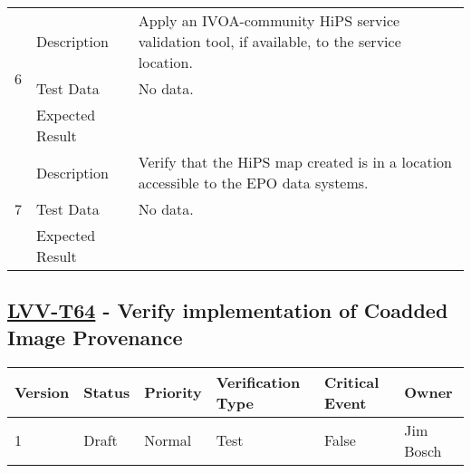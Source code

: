 \begin{longtable}[]{p{1.3cm}p{2cm}p{13cm}}
            \multirow{3}{*}{ 6 } & Description &
            \begin{minipage}[t]{13cm}{\footnotesize
            Apply an IVOA-community HiPS service validation tool, if available, to
the service location.

            \vspace{\dp0}
            } \end{minipage} \\ \cline{2-3}
            & Test Data &
            \begin{minipage}[t]{13cm}{\footnotesize
                No data.
                \vspace{\dp0}
            } \end{minipage} \\ \cline{2-3}
            & Expected Result &
        \\ \midrule

            \multirow{3}{*}{ 7 } & Description &
            \begin{minipage}[t]{13cm}{\footnotesize
            Verify that the HiPS map created is in a location accessible to the EPO
data systems.

            \vspace{\dp0}
            } \end{minipage} \\ \cline{2-3}
            & Test Data &
            \begin{minipage}[t]{13cm}{\footnotesize
                No data.
                \vspace{\dp0}
            } \end{minipage} \\ \cline{2-3}
            & Expected Result &
        \\ \midrule
    \end{longtable}

\subsection{\href{https://jira.lsstcorp.org/secure/Tests.jspa\#/testCase/LVV-T64}{LVV-T64}
    - Verify implementation of Coadded Image Provenance}\label{lvv-t64}

\begin{longtable}[]{llllll}
\toprule
Version & Status & Priority & Verification Type & Critical Event & Owner
\\\midrule
1 & Draft & Normal &
Test & False & Jim Bosch
\\\bottomrule
\end{longtable}

